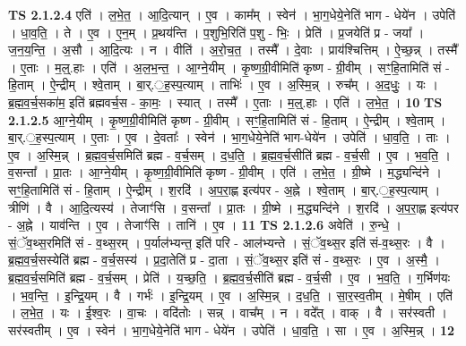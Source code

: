 \documentclass[17pt]{extarticle}
\begin{document}
                  \newline
                                \textbf{ TS 2.1.2.4} \newline
                  एति॑ । ल॒भे॒त॒ । आ॒दि॒त्यान् । ए॒व । काम᳚म् । स्वेन॑ । भा॒ग॒धेये॒नेति॑ भाग - धेये॑न । उपेति॑ । धा॒व॒ति॒ । ते । ए॒व । ए॒न॒म् । प्र॒थय॑न्ति । प॒शुभि॒रिति॑ प॒शु - भिः॒ । प्रेति॑ । प्र॒जयेति॑ प्र - जया᳚ । ज॒न॒य॒न्ति॒ । अ॒सौ । आ॒दि॒त्यः । न । वीति॑ । अ॒रो॒च॒त॒ । तस्मै᳚ । दे॒वाः । प्राय॑श्चित्तिम् । ऐ॒च्छ॒न्न् । तस्मै᳚ । ए॒ताः । म॒ल्॒.हाः । एति॑ । अ॒ल॒भ॒न्त॒ । आ॒ग्ने॒यीम् । कृ॒ष्ण॒ग्री॒वीमिति॑ कृष्ण - ग्री॒वीम् । सꣳ॒॒हि॒तामिति॑ सं - हि॒ताम् । ऐ॒न्द्रीम् । श्वे॒ताम् । बा॒र्.॒ह॒स्प॒त्याम् । ताभिः॑ । ए॒व । अ॒स्मि॒न्न् । रुच᳚म् । अ॒द॒धुः॒ । यः । ब्र॒ह्म॒व॒र्च॒सका॑म॒ इति॑ ब्रह्मवर्च॒स - का॒मः॒ । स्यात् । तस्मै᳚ । ए॒ताः । म॒ल्॒.हाः । एति॑ । ल॒भे॒त॒ । \textbf{  10} \newline
                  \newline
                                \textbf{ TS 2.1.2.5} \newline
                  आ॒ग्ने॒यीम् । कृ॒ष्ण॒ग्री॒वीमिति॑ कृष्ण - ग्री॒वीम् । सꣳ॒॒हि॒तामिति॑ सं - हि॒ताम् । ऐ॒न्द्रीम् । श्वे॒ताम् । बा॒र्.॒ह॒स्प॒त्याम् । ए॒ताः । ए॒व । दे॒वताः᳚ । स्वेन॑ । भा॒ग॒धेये॒नेति॑ भाग-धेये॑न । उपेति॑ । धा॒व॒ति॒ । ताः । ए॒व । अ॒स्मि॒न्न् । ब्र॒ह्म॒व॒र्च॒समिति॑ ब्रह्म - व॒र्च॒सम् । द॒ध॒ति॒ । ब्र॒ह्म॒व॒र्च॒सीति॑ ब्रह्म - व॒र्च॒सी । ए॒व । भ॒व॒ति॒ । व॒सन्ता᳚ । प्रा॒तः । आ॒ग्ने॒यीम् । कृ॒ष्ण॒ग्री॒वीमिति॑ कृष्ण - ग्री॒वीम् । एति॑ । ल॒भे॒त॒ । ग्री॒ष्मे । म॒द्ध्यन्दि॑ने । सꣳ॒॒हि॒तामिति॑ सं - हि॒ताम् । ऐ॒न्द्रीम् । श॒रदि॑ । अ॒प॒रा॒ह्ण इत्य॑पर - अ॒ह्ने । श्वे॒ताम् । बा॒र्.॒ह॒स्प॒त्याम् । त्रीणि॑ । वै । आ॒दि॒त्यस्य॑ । तेजाꣳ॑सि । व॒सन्ता᳚ । प्रा॒तः । ग्री॒ष्मे । म॒द्ध्यन्दि॑ने । श॒रदि॑ । अ॒प॒रा॒ह्ण इत्य॑पर - अ॒ह्ने । याव॑न्ति । ए॒व । तेजाꣳ॑सि । तानि॑ । ए॒व । \textbf{  11} \newline
                  \newline
                                \textbf{ TS 2.1.2.6} \newline
                  अवेति॑ । रु॒न्धे॒ । सं॒ॅव॒थ्स॒रमिति॑ सं - व॒थ्स॒रम् । प॒र्याल॑भ्यन्त॒ इति॑ परि - आल॑भ्यन्ते । सं॒ॅव॒थ्स॒र इति॑ सं-व॒थ्स॒रः । वै । ब्र॒ह्म॒व॒र्च॒सस्येति॑ ब्रह्म - व॒र्च॒सस्य॑ । प्र॒दा॒तेति॑ प्र - दा॒ता । सं॒ॅव॒थ्स॒र इति॑ सं - व॒थ्स॒रः । ए॒व । अ॒स्मै॒ । ब्र॒ह्म॒व॒र्च॒समिति॑ ब्रह्म - व॒र्च॒सम् । प्रेति॑ । य॒च्छ॒ति॒ । ब्र॒ह्म॒व॒र्च॒सीति॑ ब्रह्म - व॒र्च॒सी । ए॒व । भ॒व॒ति॒ । ग॒र्भिण॑यः । भ॒व॒न्ति॒ । इ॒न्द्रि॒यम् । वै । गर्भः॑ । इ॒न्द्रि॒यम् । ए॒व । अ॒स्मि॒न्न् । द॒ध॒ति॒ । सा॒र॒स्व॒तीम् । मे॒षीम् । एति॑ । ल॒भे॒त॒ । यः । ई॒श्व॒रः । वा॒चः । वदि॑तोः । सन्न् । वाच᳚म् । न । वदे᳚त् । वाक् । वै । सर॑स्वती । सर॑स्वतीम् । ए॒व । स्वेन॑ । भा॒ग॒धेये॒नेति॑ भाग - धेये॑न । उपेति॑ । धा॒व॒ति॒ । सा । ए॒व । अ॒स्मि॒न्न् । \textbf{  12} \newline
\end{document}
